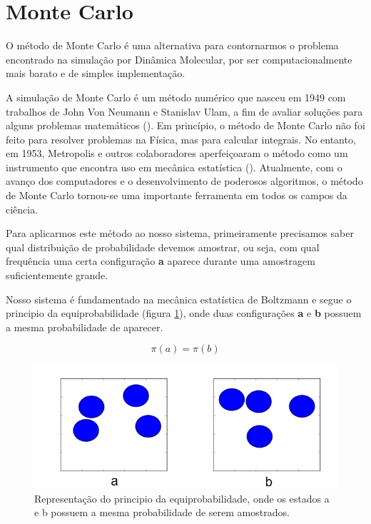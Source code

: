 \documentclass[%
reprint,
amsmath,amssymb,
aps,
12pt
]{revtex4-1}
\begin{document}
\section{Monte Carlo}

O método de Monte Carlo é uma alternativa para contornarmos o problema encontrado na simulação por Dinâmica Molecular, por ser computacionalmente mais barato e de simples implementação.

A simulação de Monte Carlo é um método numérico que nasceu em 1949 com trabalhos de John Von Neumann e Stanislav Ulam, a fim de avaliar soluções para alguns problemas matemáticos (\cite{newman}). Em princípio, o método de Monte Carlo não foi feito para resolver problemas na Física, mas para calcular integrais. No entanto, em 1953, Metropolis e outros colaboradores aperfeiçoaram o método como um instrumento que encontra uso em mecânica estatística (\cite{metrop}). Atualmente, com o avanço dos computadores e o desenvolvimento de poderosos algoritmos, o método de Monte Carlo tornou-se uma importante ferramenta em todos os campos da ciência.

 Para aplicarmos este método ao nosso sistema, primeiramente precisamos saber qual distribuição de probabilidade devemos amostrar, ou seja, com qual frequência uma certa configuração \textbf{a} aparece durante uma amostragem suficientemente grande. 

Nosso sistema é fundamentado na mecânica estatística de Boltzmann e segue o principio da equiprobabilidade (figura \ref{mc}), onde duas configurações \textbf{a} e \textbf{b} possuem a mesma probabilidade de aparecer.

\begin{equation}
\pi(a) = \pi(b)
\end{equation}




\begin{figure}[!h]
	\centering
	\includegraphics[scale=0.5]{mc.png}
	\caption{Representação do principio da equiprobabilidade, onde os estados a e b possuem a mesma probabilidade de serem amostrados.
		\label{mc}}
\end{figure}	
\end{document}
